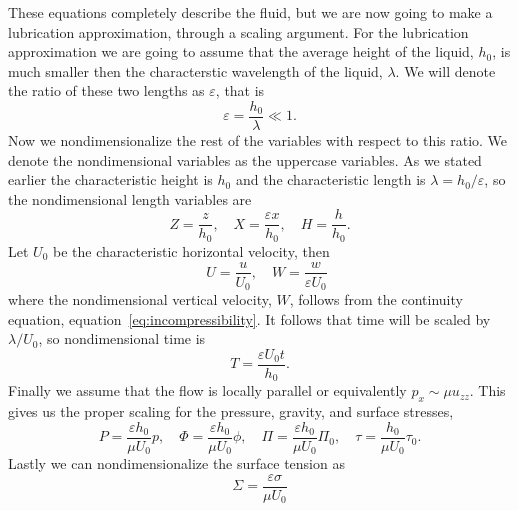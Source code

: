 \documentclass[oneside]{article}
\begin{document}
  These equations completely describe the fluid, but we are now going to make a
  lubrication approximation, through a scaling argument.
  For the lubrication approximation we are going to assume that the average height of
  the liquid, \(h_0\), is much smaller then the characterstic wavelength of the liquid,
  \(\lambda \).
  We will denote the ratio of these two lengths as \(\varepsilon \), that is
  \begin{equation}
    \varepsilon = \frac{h_0}{\lambda} \ll 1.
  \end{equation}
  Now we nondimensionalize the rest of the variables with respect to this ratio.
  We denote the nondimensional variables as the uppercase variables.
  As we stated earlier the characteristic height is \(h_0\) and the characteristic
  length is \(\lambda = h_0/\varepsilon \), so the nondimensional length variables are
  \begin{equation}
    Z = \frac{z}{h_0}, \quad X = \frac{\varepsilon x}{h_0}, \quad H = \frac{h}{h_0}.
  \end{equation}
  Let \(U_0\) be the characteristic horizontal velocity, then
  \begin{equation}
    \quad U = \frac{u}{U_0}, \quad W = \frac{w}{\varepsilon U_0}
  \end{equation}
  where the nondimensional vertical velocity, \(W\), follows from the continuity
  equation, equation~\eqref{eq:incompressibility}.
  It follows that time will be scaled by \(\lambda/U_0\), so nondimensional time is
  \begin{equation}
    T = \frac{\varepsilon U_0 t}{h_0}.
  \end{equation}
  Finally we assume that the flow is locally parallel or equivalently
  \(p_x \sim \mu u_{zz}\).
  This gives us the proper scaling for the pressure, gravity, and surface stresses,
  \begin{equation}
    P = \frac{\varepsilon h_0}{\mu U_0} p, \quad
    \Phi = \frac{\varepsilon h_0}{\mu U_0}\phi, \quad
    \Pi = \frac{\varepsilon h_0}{\mu U_0}\Pi_0, \quad
    \tau = \frac{h_0}{\mu U_0}\tau_0.
  \end{equation}
  Lastly we can nondimensionalize the surface tension as
  \begin{equation}
    \Sigma = \frac{\varepsilon \sigma}{\mu U_0}
  \end{equation}
\end{document}
